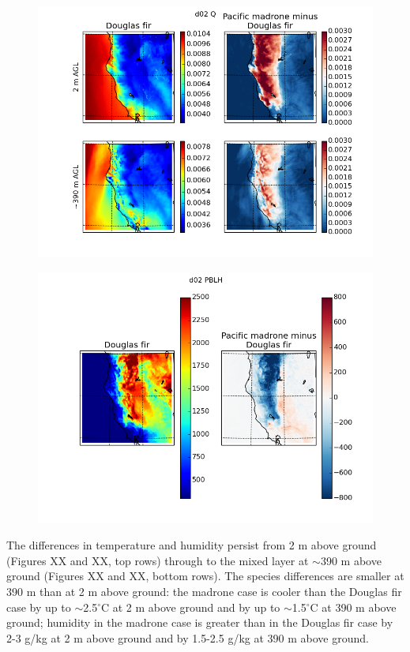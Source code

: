 \begin{figure}[here]
\includegraphics[width=1\textwidth]{ch2-BL/figures/Q_d02_s0pt08.png}
\caption{}
\label{fig:BL_WRFmapQ}
\end{figure}

\begin{figure}[here]
\includegraphics[width=1\textwidth]{ch2-BL/figures/PBLH_d02_s0pt08.png}
\caption{}
\label{fig:BL_WRFmapPBLH}
\end{figure}

The differences in temperature and humidity persist from 2 m above ground (Figures XX and XX, top rows) through to the mixed layer at $\sim$390 m above ground (Figures XX and XX, bottom rows). The species differences are smaller at 390 m than at 2 m above ground: the madrone case is cooler than the Douglas fir case by up to $\sim$2.5$^\circ$C at 2 m above ground and by up to $\sim$1.5$^\circ$C at 390 m above ground; humidity in the madrone case is greater than in the Douglas fir case by 2-3 g/kg at 2 m above ground and by 1.5-2.5 g/kg at 390 m above ground.

